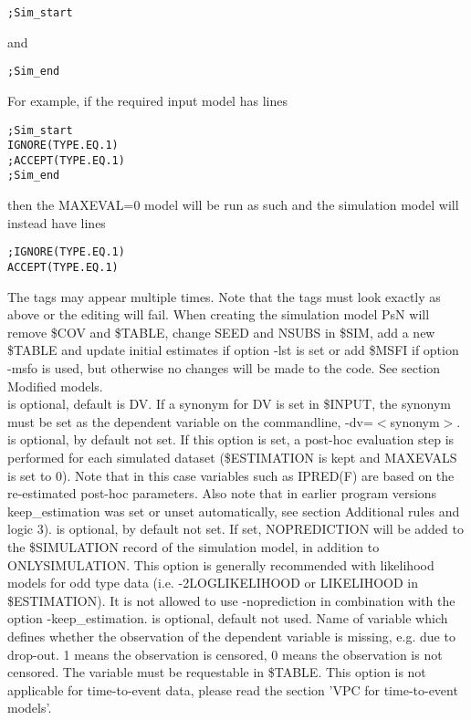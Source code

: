 \begin{optionlist}
\begin{verbatim}
;Sim_start
\end{verbatim}
and 
\begin{verbatim}
;Sim_end
\end{verbatim}
For example, if the required input model has lines
\begin{verbatim}
;Sim_start 
IGNORE(TYPE.EQ.1)
;ACCEPT(TYPE.EQ.1) 
;Sim_end
\end{verbatim}
then the MAXEVAL=0 model will be run as such and the simulation model will instead have lines
\begin{verbatim}
;IGNORE(TYPE.EQ.1)
ACCEPT(TYPE.EQ.1) 
\end{verbatim}
The tags may appear multiple times. Note that the tags must look exactly  as above or the editing will fail. When creating the simulation model PsN will remove \$COV and \$TABLE, change SEED and NSUBS in \$SIM, add a new \$TABLE and  update initial estimates if option -lst is set or add \$MSFI if option -msfo is used, but otherwise no changes will be made to the code. See section Modified models.\\
\nextopt
{}
is optional, default is DV. If a synonym for DV is set in \$INPUT, the synonym must be set as the dependent variable on the commandline, -dv=$<$synonym$>$. 
\nextopt
{}
is optional, by default not set. If this option is set, a post-hoc evaluation step is performed for each simulated dataset (\$ESTIMATION is kept and MAXEVALS is set to 0). Note that in this case variables such as IPRED(F) are based on the re-estimated post-hoc parameters. Also note that in earlier program versions keep\_estimation was set or unset automatically, see section Additional rules and logic 3). 
\nextopt
{}
is optional, by default not set. If set, NOPREDICTION will be added to the \$SIMULATION record of the simulation model, in addition to ONLYSIMULATION. This option is generally recommended with likelihood models for odd type data (i.e. -2LOGLIKELIHOOD or LIKELIHOOD in \$ESTIMATION). It is not allowed to use -noprediction in combination with the option \mbox{-keep\_estimation}. 
\nextopt
{}
is optional, default not used. Name of variable which defines whether the observation of the dependent variable is missing, e.g. due to drop-out. 1 means the observation is censored, 0 means the observation is not censored. The variable must be requestable in \$TABLE. This option is not applicable for time-to-event data, please read the section 'VPC for time-to-event models'. 

\end{optionlist}
